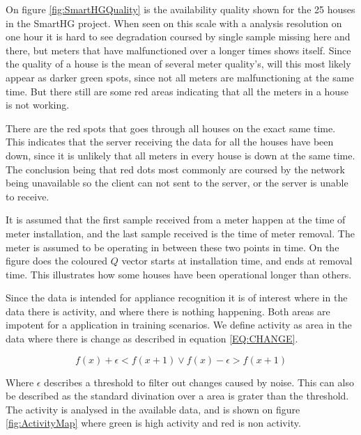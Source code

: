 On figure \ref{fig:SmartHGQuality} is the availability quality shown for the 25 houses in the SmartHG project. When seen on this scale with a analysis resolution on one hour it is hard to see degradation coursed by single sample missing here and there, but meters that have malfunctioned over a longer times shows itself. Since the quality of a house is the mean of several meter quality's, will this most likely appear as darker green spots, since not all meters are malfunctioning at the same time. But there still are some red areas indicating that all the meters in a house is not working. 

There are the red spots that goes through all houses on the exact same time. This indicates that the server receiving the data for all the houses have been down, since it is unlikely that all meters in every house is down at the same time. The conclusion being that red dots most commonly are coursed by the network being unavailable so the client can not sent to the server, or the server is unable to receive. 

It is assumed that the first sample received from a meter happen at the time of meter installation, and the last sample received is the time of meter removal. The meter is assumed to be operating in between these two points in time. On the figure does the coloured $Q$ vector starts at installation time, and ends at removal time. This illustrates how some houses have been operational longer than others. 

Since the data is intended for appliance recognition it is of interest where in the data there is activity, and where there is nothing happening. Both areas are impotent for a  application in training scenarios. We define activity as area in the data where there is change as described in equation \ref{EQ:CHANGE}.

\begin{equation}
f(x) + \epsilon < f(x+1) \vee f(x) - \epsilon > f(x+1)
\label{EQ:CHANGE}
\end{equation}

Where $\epsilon$ describes a threshold to filter out changes caused by noise. This can also be described as the standard divination over a area is grater than the threshold. The activity is analysed in the available data, and is shown on figure \ref{fig:ActivityMap} where green is high activity and red is non activity. 

